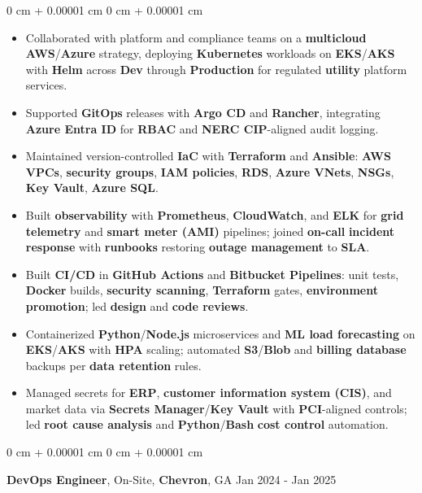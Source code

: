 \documentclass[10pt, letterpaper]{article}
\newenvironment{highlights}{
    \begin{itemize}[
        topsep=0.02 cm,
        parsep=0.02 cm,
        partopsep=0pt,
        itemsep=0pt,
        leftmargin=0 cm + 10pt
    ]
}{
    \end{itemize}
} %
\newenvironment{onecolentry}{
    \begin{adjustwidth}{
        0 cm + 0.00001 cm
    }{
        0 cm + 0.00001 cm
    }
}{
    \end{adjustwidth}
} %
\newcommand{\resumeheading}[2]{%
    \begin{onecolentry}
        #1 \hfill #2
    \end{onecolentry}
} %
\begin{document}
\begin{onecolentry}
\begin{highlights}
	\item Collaborated with platform and compliance teams on a \textbf{multicloud} \textbf{AWS}/\textbf{Azure} strategy, deploying \textbf{Kubernetes} workloads on \textbf{EKS}/\textbf{AKS} with \textbf{Helm} across \textbf{Dev} through \textbf{Production} for regulated \textbf{utility} platform services.
	\item Supported \textbf{GitOps} releases with \textbf{Argo CD} and \textbf{Rancher}, integrating \textbf{Azure Entra ID} for \textbf{RBAC} and \textbf{NERC CIP}-aligned audit logging.
	\item Maintained version-controlled \textbf{IaC} with \textbf{Terraform} and \textbf{Ansible}: \textbf{AWS VPCs}, \textbf{security groups}, \textbf{IAM policies}, \textbf{RDS}, \textbf{Azure VNets}, \textbf{NSGs}, \textbf{Key Vault}, \textbf{Azure SQL}.
	\item Built \textbf{observability} with \textbf{Prometheus}, \textbf{CloudWatch}, and \textbf{ELK} for \textbf{grid telemetry} and \textbf{smart meter (AMI)} pipelines; joined \textbf{on-call} \textbf{incident response} with \textbf{runbooks} restoring \textbf{outage management} to \textbf{SLA}.
	\item Built \textbf{CI/CD} in \textbf{GitHub Actions} and \textbf{Bitbucket Pipelines}: unit tests, \textbf{Docker} builds, \textbf{security scanning}, \textbf{Terraform} gates, \textbf{environment promotion}; led \textbf{design} and \textbf{code reviews}.
	\item Containerized \textbf{Python}/\textbf{Node.js} microservices and \textbf{ML load forecasting} on \textbf{EKS}/\textbf{AKS} with \textbf{HPA} scaling; automated \textbf{S3}/\textbf{Blob} and \textbf{billing database} backups per \textbf{data retention} rules.
	\item Managed secrets for \textbf{ERP}, \textbf{customer information system (CIS)}, and market data via \textbf{Secrets Manager}/\textbf{Key Vault} with \textbf{PCI}-aligned controls; led \textbf{root cause analysis} and \textbf{Python}/\textbf{Bash} \textbf{cost control} automation.
\end{highlights}
\end{onecolentry}


\vspace{0.12 cm}
\resumeheading{\textbf{DevOps Engineer}, On-Site, \textbf{Chevron}, GA}{Jan 2024 - Jan 2025}
\end{document}
